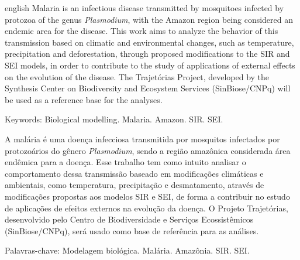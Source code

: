 \setlength{\absparsep}{18pt} 
\begin{resumo}[Abstract]
   \begin{otherlanguage*}{english}
      Malaria is an infectious disease transmitted by mosquitoes infected by protozoa of the genus \textit{Plasmodium}, with the Amazon region being considered an endemic area 
      for the disease. This work aims to analyze the behavior of this transmission based on climatic and environmental changes, such as temperature, precipitation and deforestation, through proposed 
      modifications to the SIR and SEI models, in order to contribute to the study of applications
      of external effects on the evolution of the disease. 
      The Trajetórias Project, developed by the Synthesis Center 
      on Biodiversity and Ecosystem Services (SinBiose/CNPq) will be used as a reference base for the analyses.
      
   \end{otherlanguage*}
  
   Keywords: Biological modelling. Malaria. Amazon. SIR. SEI.
  \end{resumo}

\begin{resumo}[Resumo]
    A malária é uma doença infecciosa transmitida por mosquitos infectados por protozoários do gênero \textit{Plasmodium}, sendo a região amazônica considerada área endêmica 
    para a doença. Esse trabalho tem como intuito analisar o comportamento dessa transmissão baseado em modificações climáticas e ambientais, como temperatura, precipitação e desmatamento, 
    através de modificações propostas aos modelos SIR e SEI, de forma a contribuir no estudo de aplicações 
    de efeitos externos na evolução da doença. 
    O Projeto Trajetórias, desenvolvido pelo Centro de Biodiversidade e Serviços Ecossistêmicos (SinBiose/CNPq), será usado como base de referência para as análises.
    

 Palavras-chave: Modelagem biológica. Malária. Amazônia. SIR. SEI.
\end{resumo}

